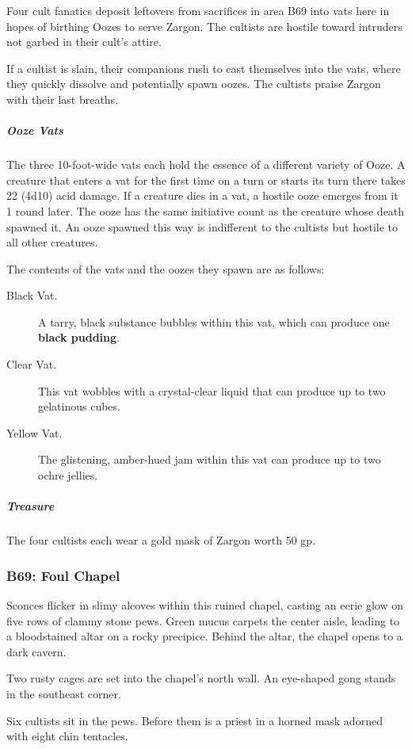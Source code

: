 \documentclass[10pt,a4paper,twoside,bg=print,twocolumn,openany,nodeprecatedcode]{dndbook}
\begin{document}
Four cult fanatics deposit leftovers from sacrifices in area B69 into vats here in hopes of birthing Oozes to serve Zargon. The cultists are hostile toward intruders not garbed in their cult's attire.

If a cultist is slain, their companions rush to cast themselves into the vats, where they quickly dissolve and potentially spawn oozes. The cultists praise Zargon with their last breaths.

\subparagraph{Ooze Vats}
The three 10-foot-wide vats each hold the essence of a different variety of Ooze. A creature that enters a vat for the first time on a turn or starts its turn there takes 22 (4d10) acid damage. If a creature dies in a vat, a hostile ooze emerges from it 1 round later. The ooze has the same initiative count as the creature whose death spawned it. An ooze spawned this way is indifferent to the cultists but hostile to all other creatures.

The contents of the vats and the oozes they spawn are as follows:


\begin{description}
\item[Black Vat.]
A tarry, black substance bubbles within this vat, which can produce one \textbf{black pudding}.
\item[Clear Vat.]
This vat wobbles with a crystal-clear liquid that can produce up to two gelatinous cubes.
\item[Yellow Vat.]
The glistening, amber-hued jam within this vat can produce up to two ochre jellies.
\end{description}

\subparagraph{Treasure}
The four cultists each wear a gold mask of Zargon worth 50 gp.

\subsubsection{B69: Foul Chapel}
\begin{DndReadAloud}{}
Sconces flicker in slimy alcoves within this ruined chapel, casting an eerie glow on five rows of clammy stone pews. Green mucus carpets the center aisle, leading to a bloodstained altar on a rocky precipice. Behind the altar, the chapel opens to a dark cavern.

Two rusty cages are set into the chapel's north wall. An eye-shaped gong stands in the southeast corner.

Six cultists sit in the pews. Before them is a priest in a horned mask adorned with eight chin tentacles.

\end{DndReadAloud}
\end{document}

